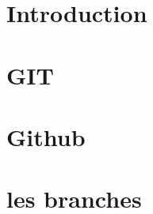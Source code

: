 \documentclass[11pt,fleqn]{book} %
\begin{document}






\chapter{Introduction}



\chapter{GIT}



\chapter{Github}



\chapter{les branches}



%
%
%
%
\end{document}
